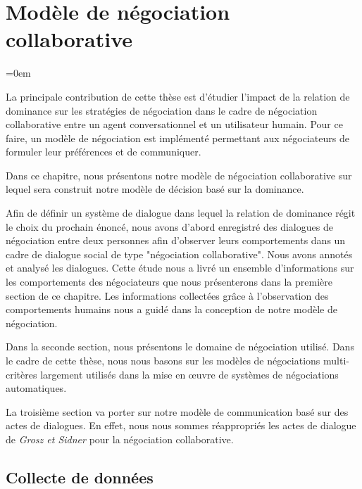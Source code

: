 	\chapter{Modèle de négociation collaborative}
	
	\begingroup
	\parindent=0em
	\localtableofcontents 
	\clearpage
	\endgroup
	
	La principale contribution de cette thèse est d'étudier l'impact de la relation de dominance sur les stratégies de négociation dans le cadre de négociation collaborative entre un agent conversationnel et un utilisateur humain. 
	Pour ce faire, un modèle de négociation est implémenté permettant aux négociateurs de formuler leur préférences et de communiquer. 
	
	Dans ce chapitre, nous présentons notre modèle de négociation collaborative sur lequel sera construit notre modèle de décision basé sur la dominance. 
	
	Afin de définir un système de dialogue dans lequel la relation de dominance régit le choix du prochain énoncé, nous avons d'abord enregistré des dialogues de négociation entre deux personnes afin d'observer leurs comportements dans un cadre de dialogue social de type "négociation collaborative". Nous avons annotés et analysé les dialogues. Cette étude nous a livré un ensemble d'informations sur les comportements des négociateurs que nous présenterons dans la première section de ce chapitre. 
	Les informations collectées grâce à l'observation des comportements humains nous a guidé dans la conception de notre modèle de négociation.
	
	Dans la seconde section, nous présentons le domaine de négociation utilisé. Dans le cadre de cette thèse, nous nous basons sur les modèles de négociations multi-critères largement utilisés dans la mise en œuvre de systèmes de négociations automatiques. 
	
	La troisième section va porter sur notre modèle de communication basé sur des actes de dialogues. En effet, nous nous sommes réappropriés les actes de dialogue de \emph{Grosz et Sidner} \cite{grosz1986attention} pour la négociation collaborative.
	
	
	 \section{Collecte de données}
	
		
